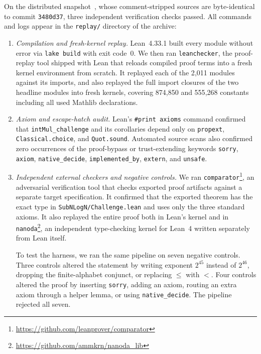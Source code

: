 On the distributed snapshot~\cite{Lean26}, whose comment-stripped sources are byte-identical to commit \texttt{3480d37}, three independent verification checks passed. All commands and logs appear in the \texttt{replay/} directory of the archive:
\begin{enumerate}[label=(\arabic*),leftmargin=*,itemsep=2pt]
\item \emph{Compilation and fresh-kernel replay.} Lean~4.33.1 built every module without error via \texttt{lake build} with exit code~0. We then ran \texttt{leanchecker}, the proof-replay tool shipped with Lean that reloads compiled proof terms into a fresh kernel environment from scratch. It replayed each of the 2{,}011 modules against its imports, and also replayed the full import closures of the two headline modules into fresh kernels, covering 874{,}850 and 555{,}268 constants including all used Mathlib declarations.

\item \emph{Axiom and escape-hatch audit.} Lean's \texttt{\#print axioms} command confirmed that \texttt{intMul\_\allowbreak challenge} and its corollaries depend only on \texttt{propext}, \texttt{Classical.\allowbreak choice}, and \texttt{Quot.\allowbreak sound}. Automated source scans also confirmed zero occurrences of the proof-bypass or trust-extending keywords \texttt{sorry}, \texttt{axiom}, \texttt{native\_\allowbreak decide}, \texttt{implemented\_\allowbreak by}, \texttt{extern}, and \texttt{unsafe}.

\item \emph{Independent external checkers and negative controls.} We ran \texttt{comparator}\footnote{\url{https://github.com/leanprover/comparator}}, an adversarial verification tool that checks exported proof artifacts against a separate target specification. It confirmed that the exported theorem has the exact type in \texttt{SubNLogN/\allowbreak Challenge.lean} and uses only the three standard axioms. It also replayed the entire proof both in Lean's kernel and in \texttt{nanoda}\footnote{\url{https://github.com/ammkrn/nanoda_lib}}, an independent type-checking kernel for Lean~4 written separately from Lean itself.

To test the harness, we ran the same pipeline on seven negative controls. Three controls altered the statement by writing exponent $2^{45}$ instead of $2^{46}$, dropping the finite-alphabet conjunct, or replacing $\le$ with $<$. Four controls altered the proof by inserting \texttt{sorry}, adding an axiom, routing an extra axiom through a helper lemma, or using \texttt{native\_decide}. The pipeline rejected all seven.
\end{enumerate}

